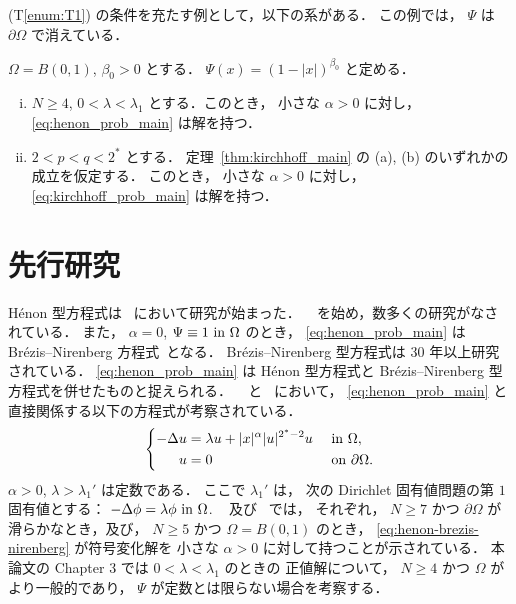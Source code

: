 (T\ref{enum:T1}) の条件を充たす例として，以下の系がある．
この例では， $\Psi$ は $\partial \Omega$ で消えている．

\begin{cor}[Corollary~1.1.3] \label{cor:cor_of_main_theorem}
  $\Omega = B(0, 1)$, $\beta_0 > 0$ とする．
  $\Psi(x) = \left(1 - \lvert x \rvert \right)^{\beta_0}$ と定める．
  \begin{enumerate}[(i)]
    \item
      $N \geq 4$, $0 < \lambda < \lambda_1$ とする．このとき，
      小さな $\alpha > 0$ に対し， \eqref{eq:henon_prob_main} は解を持つ．
    \item
      $2 < p < q < 2^*$ とする．
      定理~\ref{thm:kirchhoff_main} の (a), (b) のいずれかの成立を仮定する．
      このとき，
      小さな $\alpha > 0$ に対し， \eqref{eq:kirchhoff_prob_main} は解を持つ．
  \end{enumerate}
\end{cor}

\section{先行研究}

Hénon 型方程式は~\cite{henon1973numerical} において研究が始まった．
~\cite{MR674869} を始め，数多くの研究がなされている．
また， $\alpha = 0$, $\Psi \equiv 1 \text{ in } \Omega$ のとき，
\eqref{eq:henon_prob_main} は Brézis--Nirenberg
方程式~\cite{MR709644}となる．
Brézis--Nirenberg 型方程式は $30$ 年以上研究されている．
\eqref{eq:henon_prob_main} は Hénon 型方程式と
Brézis--Nirenberg 型方程式を併せたものと捉えられる．
~\cite{MR2951742} と~\cite{MR2951722} において，
\eqref{eq:henon_prob_main} と直接関係する以下の方程式が考察されている．
\begin{align}
  \left\{
  \begin{aligned}
    - \Delta u       & = \lambda u + \lvert x \rvert^\alpha \lvert u
    \rvert^{2^*-2} u &                                               & \text{ in } \Omega,                         \\
    u                & = 0                                           &              & \text{ on } \partial \Omega.
  \end{aligned}
  \right. \label{eq:henon-brezis-nirenberg}
\end{align}
$\alpha > 0$, $\lambda > \lambda_1'$ は定数である．
ここで $\lambda_1'$ は，
次の Dirichlet 固有値問題の第 $1$ 固有値とする：
$-\Delta \phi = \lambda \phi \text{ in } \Omega$.
~\cite{MR2951742} 及び~\cite{MR2951722} では，
それぞれ，
$N \geq 7$ かつ $\partial\Omega$ が滑らかなとき，及び，
$N \geq 5$ かつ $\Omega = B(0, 1)$ のとき，
\eqref{eq:henon-brezis-nirenberg} が符号変化解を
小さな $\alpha > 0$ に対して持つことが示されている．
本論文の Chapter 3 では $0 < \lambda < \lambda_1$ のときの
正値解について， $N \geq 4$ かつ $\Omega$ がより一般的であり，
$\Psi$ が定数とは限らない場合を考察する．

